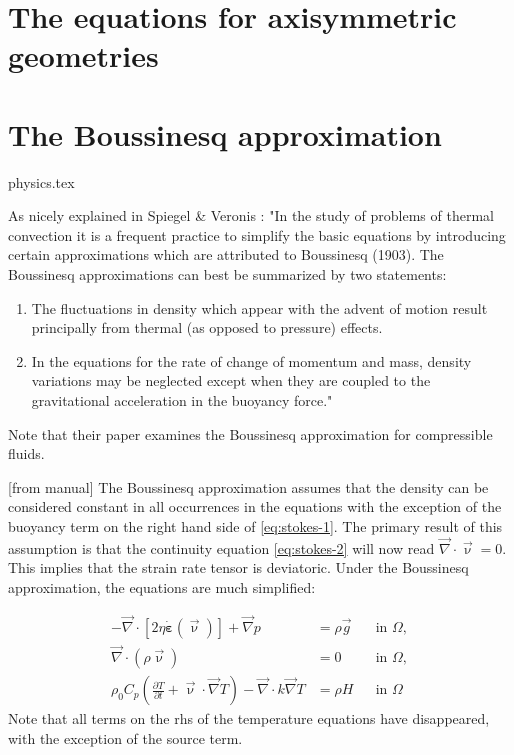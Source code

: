 
\section{The equations for axisymmetric geometries \label{ss:axicyleqs}}



\newpage
\section{The Boussinesq approximation}
\begin{flushright} {\tiny {\color{gray} physics.tex}} \end{flushright}

As nicely explained in Spiegel \& Veronis \cite{spve60}: "In the study of problems of thermal convection it is a frequent practice to simplify the basic equations by introducing certain approximations which are attributed to
Boussinesq (1903). The Boussinesq approximations can best be summarized by two
statements: 
\begin{enumerate}
\item The fluctuations in density which appear with the advent of motion
result principally from thermal (as opposed to pressure) effects. 
\item In the equations
for the rate of change of momentum and mass, density variations may be neglected except
when they are coupled to the gravitational acceleration in the buoyancy force."
\end{enumerate}
Note that their paper examines the Boussinesq approximation for compressible fluids.  

[from \aspect{} manual]
The Boussinesq approximation assumes that the density can be
considered constant in all occurrences in the equations with the exception of
the buoyancy term on the right hand side of \eqref{eq:stokes-1}. The primary
result of this assumption is that the continuity equation \eqref{eq:stokes-2}
will now read ${\vec \nabla}\cdot{\vec \upnu} = 0$.
This implies that the strain rate tensor is deviatoric.
Under the Boussinesq approximation, the equations are much simplified:

\begin{align}
  \label{eq:stokes-1a}
  -\vec\nabla \cdot \left[2\eta \dot{\bm \varepsilon}(\vec\upnu)
                \right] + \vec\nabla p &=
  \rho \vec{g}
  &
  & \textrm{in $\Omega$},
  \\
  \label{eq:stokes-2a}
  \vec\nabla \cdot (\rho \vec\upnu) &= 0
  &
  & \textrm{in $\Omega$},
  \\
  \label{eq:temperaturee}
  \rho_0 C_p \left(\frac{\partial T}{\partial t} + \vec\upnu \cdot\vec\nabla T\right)
  - \vec\nabla\cdot k\vec\nabla T
  &=
  \rho H
  &
  & \textrm{in $\Omega$}
\end{align}
Note that all terms on the rhs of the temperature equations have disappeared, with the exception 
of the source term.


